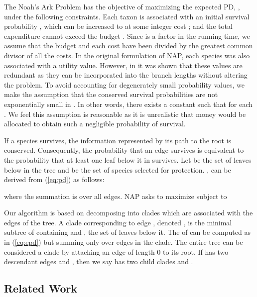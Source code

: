 \documentclass[10pt]{llncs}       \usepackage{graphicx,subfigure}
\begin{document}
The Noah's Ark Problem has the
objective of 
maximizing the expected PD, , under the following
constraints.  Each taxon  is associated with an initial survival 
probability , which can be increased to  at some integer cost ;
and the total expenditure cannot exceed the budget .  Since  is a 
factor in the running time, we assume that the budget and each cost have been
divided by the greatest common divisor of all the costs. 
In the original
formulation of NAP, each species was also associated with a utility
value. However, 
in \cite{hartmann06} it was shown that
these values are redundant as they can
be incorporated into the branch lengths without altering the problem.
To avoid accounting for degenerately small probability values, we make the
assumption that the conserved survival probabilities are not exponentially
 small in . In
other words, there exists a constant  such that  for each
.
We feel this assumption is reasonable as it is unrealistic that money would
be allocated to obtain such a negligible probability of survival.

If a species survives, the information represented by its path to the root
is conserved.  Consequently, the probability that an edge survives is 
equivalent to the probability that at least one leaf below it in 
 survives.  Let  be the set of leaves below  in the
tree and  be the set of species selected for 
protection.  
, can be derived from 
(\ref{eq:pd})  as follows: 

where the summation is over all edges. NAP asks to maximize 
subject to

Our algorithm is based on decomposing  into clades which are
associated with the edges of the tree. 
A clade corresponding to edge , denoted ,
 is the minimal subtree of 
containing  and , the set of leaves below it.  The  of 
 can be computed
as in (\ref{eq:epd}) but summing only over edges in the clade.  
The entire tree can be considered a clade by
attaching an edge of length 0 to its root.  If  has two 
descendant edges  and ,
then we say  has two 
child clades  and . 

\subsection{Related Work}
\end{document}
